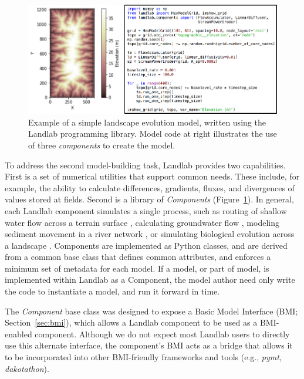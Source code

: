 \documentclass[12pt]{amsart}
\begin{document}
\begin{figure}[h!]
\centering
\includegraphics{Figures/landlab_component_lem.pdf}
\caption{Example of a simple landscape evolution model, written using the Landlab programming library. Model code at right illustrates the use of three \textit{components} to create the model.}
\label{fig:landlablem}
\end{figure}

To address the second model-building task, Landlab provides two capabilities. First is a set of numerical utilities that support common needs. These include, for example, the ability to calculate differences, gradients, fluxes, and divergences of values stored at fields. Second is a library of \textit{Components} (Figure~\ref{fig:landlablem}). In general, each Landlab component simulates a single process, such as routing of shallow water flow across a terrain surface \citep{adams2017landlab}, calculating groundwater flow \citep{litwin2020groundwaterdupuitpercolator}, modeling sediment movement in a river network \citep{pfeiffer2020networksedimenttransporter}, or simulating biological evolution across a landscape \citep{lyons2020speciesevolver}. Components are implemented as Python classes, and are derived from a common base class that defines common attributes, and enforces a minimum set of metadata for each model. If a model, or part of model, is implemented within Landlab as a Component, the model author need only write the code to instantiate a model, and run it forward in time.

The \textit{Component} base class was designed to expose a Basic Model Interface (BMI; Section~\ref{sec:bmi}), which allows a Landlab component to be used as a BMI-enabled component.
Although we do not expect most Landlab users to directly use this alternate interface, the
component's BMI acts as a bridge that allows it to be incorporated into other BMI-friendly
frameworks and tools (e.g., \textit{pymt}, \textit{dakotathon}).
\end{document}
